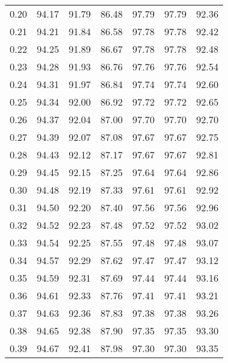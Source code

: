 \begin{tabular}{|c|c|c|c|c|c|c|}
      0.20 &     94.17 &     91.79 &      86.48 &   97.79 &      97.79 &         92.36 \\
      0.21 &     94.21 &     91.84 &      86.58 &   97.78 &      97.78 &         92.42 \\
      0.22 &     94.25 &     91.89 &      86.67 &   97.78 &      97.78 &         92.48 \\
      0.23 &     94.28 &     91.93 &      86.76 &   97.76 &      97.76 &         92.54 \\
      0.24 &     94.31 &     91.97 &      86.84 &   97.74 &      97.74 &         92.60 \\
      0.25 &     94.34 &     92.00 &      86.92 &   97.72 &      97.72 &         92.65 \\
      0.26 &     94.37 &     92.04 &      87.00 &   97.70 &      97.70 &         92.70 \\
      0.27 &     94.39 &     92.07 &      87.08 &   97.67 &      97.67 &         92.75 \\
      0.28 &     94.43 &     92.12 &      87.17 &   97.67 &      97.67 &         92.81 \\
      0.29 &     94.45 &     92.15 &      87.25 &   97.64 &      97.64 &         92.86 \\
      0.30 &     94.48 &     92.19 &      87.33 &   97.61 &      97.61 &         92.92 \\
      0.31 &     94.50 &     92.20 &      87.40 &   97.56 &      97.56 &         92.96 \\
      0.32 &     94.52 &     92.23 &      87.48 &   97.52 &      97.52 &         93.02 \\
      0.33 &     94.54 &     92.25 &      87.55 &   97.48 &      97.48 &         93.07 \\
      0.34 &     94.57 &     92.29 &      87.62 &   97.47 &      97.47 &         93.12 \\
      0.35 &     94.59 &     92.31 &      87.69 &   97.44 &      97.44 &         93.16 \\
      0.36 &     94.61 &     92.33 &      87.76 &   97.41 &      97.41 &         93.21 \\
      0.37 &     94.63 &     92.36 &      87.83 &   97.38 &      97.38 &         93.26 \\
      0.38 &     94.65 &     92.38 &      87.90 &   97.35 &      97.35 &         93.30 \\
      0.39 &     94.67 &     92.41 &      87.98 &   97.30 &      97.30 &         93.35 \\

\end{tabular}
